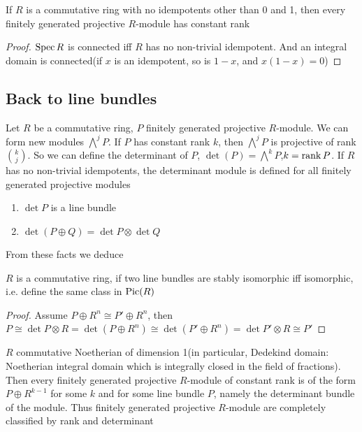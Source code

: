 \documentclass[main]{subfiles}
\begin{document}
\begin{corollary}
If $R$ is a commutative ring with no idempotents other than 0 and 1, then every finitely generated projective $R$-module has constant rank
\end{corollary}

\begin{proof}
$\operatorname{Spec} R$ is connected iff $R$ has no non-trivial idempotent. And an integral domain is connected(if $x$ is an idempotent, so is $1-x$, and $x(1-x)=0$)
\end{proof}

\subsection{Back to line bundles}

Let $R$ be a commutative ring, $P$ finitely generated projective $R$-module. We can form new modules $\bigwedge^jP$. If $P$ has constant rank $k$, then $\bigwedge^jP$ is projective of rank $\binom{k}{j}$. So we can define the determinant of $P$, $\det(P)=\bigwedge^kP$,$k=\operatorname{rank} P$. If $R$ has no non-trivial idempotents, the determinant module is defined for all finitely generated projective modules

\begin{enumerate}
\item $\det P$ is a line bundle
\item $\det(P\oplus Q)=\det P\otimes\det Q$
\end{enumerate}

From these facts we deduce

\begin{theorem}
$R$ is a commutative ring, if two line bundles are stably isomorphic iff isomorphic, i.e. define the same class in $\operatorname{Pic}(R)$
\end{theorem}

\begin{proof}
Assume $P\oplus R^n\cong P'\oplus R^n$, then $P\cong\det P\otimes R=\det(P\oplus R^n)\cong \det(P'\oplus R^n)=\det P'\otimes R\cong P'$
\end{proof}

\begin{theorem}
$R$ commutative Noetherian of dimension 1(in particular, Dedekind domain: Noetherian integral domain which is integrally closed in the field of fractions). Then every finitely generated projective $R$-module of constant rank is of the form $P\oplus R^{k-1}$ for some $k$ and for some line bundle $P$, namely the determinant bundle of the module. Thus finitely generated projective $R$-module are completely classified by rank and determinant
\end{theorem}
\end{document}
